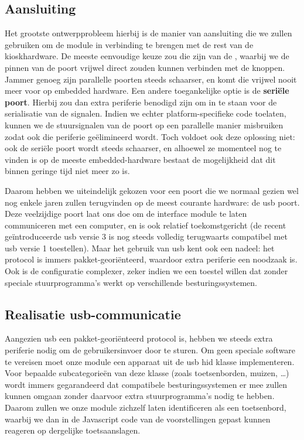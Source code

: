 \documentclass[verslag.tex]{subfiles}
\begin{document}
\subsection{Aansluiting}

Het grootste ontwerpprobleem hierbij is de manier van aansluiting die we zullen gebruiken om de module in verbinding te brengen met de rest van de kioskhardware. De meeste eenvoudige keuze zou die zijn van de , waarbij we de pinnen van de poort vrijwel direct zouden kunnen verbinden met de knoppen. Jammer genoeg zijn parallelle poorten steeds schaarser, en komt die vrijwel nooit meer voor op embedded hardware. Een andere toegankelijke optie is de \textbf{seriële poort}. Hierbij zou dan extra periferie benodigd zijn om in te staan voor de serialisatie van de signalen. Indien we echter platform-specifieke code toelaten, kunnen we de stuursignalen van de poort op een parallelle manier misbruiken zodat ook die periferie geëlimineerd wordt. Toch voldoet ook deze oplossing niet: ook de seriële poort wordt steeds schaarser, en alhoewel ze momenteel nog te vinden is op de meeste embedded-hardware bestaat de mogelijkheid dat dit binnen geringe tijd niet meer zo is.

Daarom hebben we uiteindelijk gekozen voor een poort die we normaal gezien wel nog enkele jaren zullen terugvinden op de meest courante hardware: de \ac{usb} poort. Deze veelzijdige poort laat ons doe om de interface module te laten communiceren met een computer, en is ook relatief toekomstgericht (de recent geïntroduceerde \ac{usb} versie 3 is nog steeds volledig terugwaarts compatibel met \ac{usb} versie 1 toestellen). Maar het gebruik van \ac{usb} kent ook een nadeel: het protocol is immers pakket-georiënteerd, waardoor extra periferie een noodzaak is. Ook is de configuratie complexer, zeker indien we een toestel willen dat zonder speciale stuurprogramma's werkt op verschillende besturingssystemen.

\subsection{Realisatie \acs{usb}-communicatie}

Aangezien \ac{usb} een pakket-georiënteerd protocol is, hebben we steeds extra periferie nodig om de gebruikersinvoer door te sturen. Om geen speciale software te vereisen moet onze module een apparaat uit de \ac{usb} \ac{hid} klasse implementeren. Voor bepaalde subcategorieën van deze klasse (zoals toetsenborden, muizen, \dots) wordt immers gegarandeerd dat compatibele besturingssystemen er mee zullen kunnen omgaan zonder daarvoor extra stuurprogramma's nodig te hebben. Daarom zullen we onze module zichzelf laten identificeren als een toetsenbord, waarbij we dan in de Javascript code van de voorstellingen gepast kunnen reageren op dergelijke toetsaanslagen.
\end{document}
